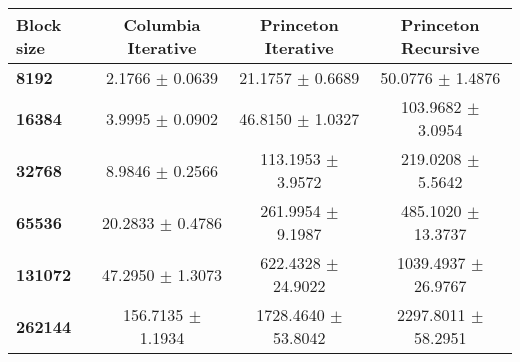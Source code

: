 \begin{tabular}{lccc}\toprule
\textbf{Block size}  & \textbf{Columbia Iterative} & \textbf{Princeton Iterative} & \textbf{Princeton Recursive}\\\midrule
\textbf{8192}  & 2.1766 $\pm$ 0.0639 & 21.1757 $\pm$ 0.6689 & 50.0776 $\pm$ 1.4876\\
\textbf{16384}  & 3.9995 $\pm$ 0.0902 & 46.8150 $\pm$ 1.0327 & 103.9682 $\pm$ 3.0954\\
\textbf{32768}  & 8.9846 $\pm$ 0.2566 & 113.1953 $\pm$ 3.9572 & 219.0208 $\pm$ 5.5642\\
\textbf{65536}  & 20.2833 $\pm$ 0.4786 & 261.9954 $\pm$ 9.1987 & 485.1020 $\pm$ 13.3737\\
\textbf{131072}  & 47.2950 $\pm$ 1.3073 & 622.4328 $\pm$ 24.9022 & 1039.4937 $\pm$ 26.9767\\
\textbf{262144} & 156.7135 $\pm$ 1.1934 & 1728.4640 $\pm$ 53.8042 & 2297.8011 $\pm$ 58.2951\\
\bottomrule
\end{tabular}
